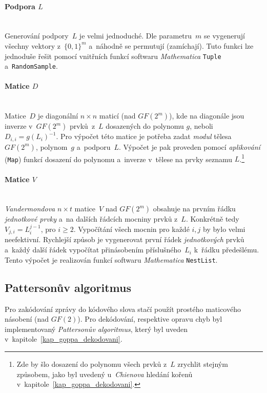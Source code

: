 \documentclass[thesis=M,czech,hidelinks]{FITthesis}[2012/06/26]
\newcommand{\0}{{\textcolor[gray]{0.75}{0}}}
\begin{document}
\paragraph{Podpora $L$} \hfil \\
Generování podpory~$L$ je velmi jednoduché. Dle parametru~$m$ se vygenerují
všechny vektory z~$\{0,1\}^m$ a~náhodně se permutují (zamíchají). Tuto funkci
lze jednoduše řešit pomocí vnitřních funkcí softwaru \emph{Mathematica}
\texttt{Tuple} a~\texttt{Ran\-domSample}. %


\paragraph{Matice $D$} \hfil \\
Matice~$D$ je diagonální $n \times n$ maticí (nad $GF(2^m)$), kde na diagonále
jsou inverze v~$GF(2^m)$ prvků~z~$L$ dosazených do polynomu $g$, neboli $D_{i,i}
= g(L_i)^{-1}$. Pro výpočet této matice je potřeba zadat \emph{modul} tělesa
$GF(2^m)$, polynom~$g$ a~podporu~$L$. Výpočet je pak proveden pomocí
\emph{aplikování} (\texttt{Map}) funkcí dosazení do polynomu a~inverze
v~tělese na prvky seznamu $L$.\footnote{
    Zde by šlo dosazení do polynomu všech prvků z~$L$ zrychlit stejným způsobem,
    jako byl uvedený u~\emph{Chienova} hledání kořenů
    v~kapitole~\ref{kap_goppa_dekodovani}.
}


\paragraph{Matice $V$} \hfil \\
\emph{Vandermondova} $n \times t$ matice~$V$ nad $GF(2^m)$ obsahuje na prvním
řádku \emph{jednotkové prvky} a~na dalších řádcích mocniny prvků z~$L$.
Konkrétně tedy $V_{j,i} = L_i^{j-1}$, pro $i\geq 2$. Vypočítání všech mocnin
pro každé $i,j$ by bylo velmi neefektivní. Rychlejší způsob je vygenerovat první
řádek \emph{jednotkových} prvků a~každý další řádek vypočítat přinásobením
příslušného~$L_i$ k~řádku předešlému. Tento výpočet je realizován funkcí
softwaru \emph{Mathematica} \texttt{NestList}.


\subsection{Pattersonův algoritmus}\label{kap_patterson}

Pro zakódování zprávy do kódového slova stačí použít prostého maticového
násobení (nad $GF(2)$). Pro dekódování, respektive opravu chyb byl
implementovaný \emph{Pattersonův algoritmus}, který byl uveden
v~kapitole~\ref{kap_goppa_dekodovani}.
\end{document}
